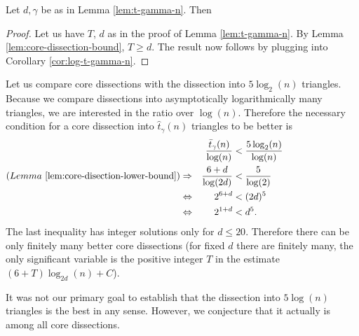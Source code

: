 \begin{lem}
\label{lem:core-disection-lower-bound}
Let $d,\gamma$ be as in Lemma \ref{lem:t-gamma-n}. Then
\end{lem}%
\begin{proof}
Let us have $T$, $d$ as in the proof of Lemma \ref{lem:t-gamma-n}. By Lemma \ref{lem:core-dissection-bound}, $T \geq d$. The result now follows by plugging into Corollary \ref{cor:log-t-gamma-n}.
\end{proof}

Let us compare core dissections with the dissection into $5 \log_2(n)$ triangles. Because we compare dissections into asymptotically logarithmically many triangles, we are interested in the ratio over $\log(n)$. Therefore the necessary condition for a core dissection into $\hat t_\gamma(n)$ triangles to be better is
\begin{align}
	& &\frac{\bar t_\gamma(n)}{\log (n)} &< \frac{5 \log_2(n)}{\log(n)} \hspace{8em} \\
	(Lemma\ \ref{lem:core-disection-lower-bound})&\Rightarrow & \frac{6+d}{\log(2d)} &< \frac{5}{\log(2)} \\
	&\Leftrightarrow & 2^{6+d} &< (2d)^5 \\
	&\Leftrightarrow &  2 ^ {1+d} &< d^5.
\end{align}
The last inequality has integer solutions only for $d \leq 20$. Therefore there can be only finitely many better core dissections (for fixed $d$ there are finitely many, the only significant variable is the positive integer $T$ in the estimate $(6+T)\log_{2d}(n) + C$).

It was not our primary goal to establish that the dissection into $5 \log(n)$ triangles is the best in any sense. However, we conjecture that it actually is among all core dissections.




